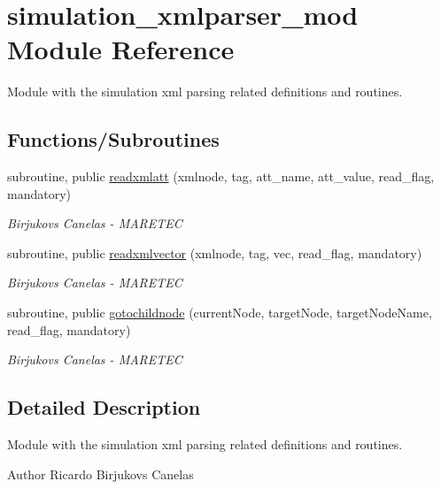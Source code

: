 \hypertarget{namespacesimulation__xmlparser__mod}{}\section{simulation\+\_\+xmlparser\+\_\+mod Module Reference}
\label{namespacesimulation__xmlparser__mod}


Module with the simulation xml parsing related definitions and routines.  


\subsection*{Functions/\+Subroutines}
\begin{DoxyCompactItemize}
\item 
subroutine, public \hyperlink{namespacesimulation__xmlparser__mod_ab062c8e064b043446d4f6ac695b306ab}{readxmlatt} (xmlnode, tag, att\+\_\+name, att\+\_\+value, read\+\_\+flag, mandatory)
\begin{DoxyCompactList}\small\item\em Birjukovs Canelas -\/ M\+A\+R\+E\+T\+EC \end{DoxyCompactList}\item 
subroutine, public \hyperlink{namespacesimulation__xmlparser__mod_a48bcd153bef2149410d66842b564728d}{readxmlvector} (xmlnode, tag, vec, read\+\_\+flag, mandatory)
\begin{DoxyCompactList}\small\item\em Birjukovs Canelas -\/ M\+A\+R\+E\+T\+EC \end{DoxyCompactList}\item 
subroutine, public \hyperlink{namespacesimulation__xmlparser__mod_a3167fcb99b40cdc25d2ba18418bd8b9f}{gotochildnode} (current\+Node, target\+Node, target\+Node\+Name, read\+\_\+flag, mandatory)
\begin{DoxyCompactList}\small\item\em Birjukovs Canelas -\/ M\+A\+R\+E\+T\+EC \end{DoxyCompactList}\end{DoxyCompactItemize}


\subsection{Detailed Description}
Module with the simulation xml parsing related definitions and routines. 

\begin{DoxyAuthor}{Author}
Ricardo Birjukovs Canelas 
\end{DoxyAuthor}


